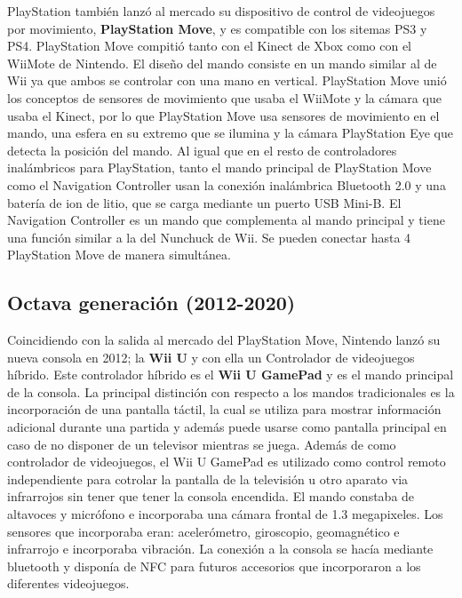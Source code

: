 PlayStation tambi\'en lanz\'o al mercado su dispositivo de control de videojuegos por movimiento, \textbf{PlayStation Move}, y es compatible con los sitemas PS3 y PS4. PlayStation Move compiti\'o tanto con el Kinect de Xbox como con el WiiMote de Nintendo. El dise\~no del mando consiste en un mando similar al de Wii ya que ambos se controlar con una mano en vertical. PlayStation Move uni\'o los conceptos de sensores de movimiento que usaba el WiiMote y la c\'amara que usaba el Kinect, por lo que PlayStation Move usa sensores de movimiento en el mando, una esfera en su extremo que se ilumina y la c\'amara PlayStation Eye que detecta la posici\'on del mando. Al igual que en el resto de controladores inal\'ambricos para PlayStation, tanto el mando principal de PlayStation Move como el Navigation Controller usan la conexi\'on inal\'ambrica Bluetooth 2.0 y una bater\'ia de ion de litio, que se carga mediante un puerto USB Mini-B. El Navigation Controller es un mando que complementa al mando principal y tiene una funci\'on similar a la del Nunchuck de Wii. Se pueden conectar hasta 4 PlayStation Move de manera simult\'anea.\\

\subsection{Octava generaci\'on (2012-2020)}

Coincidiendo con la salida al mercado del PlayStation Move, Nintendo lanz\'o su nueva consola en 2012; la \textbf{Wii U} y con ella un Controlador de videojuegos h\'ibrido. Este controlador h\'ibrido es el \textbf{Wii U GamePad} y es el mando principal de la consola. La principal distinci\'on con respecto a los mandos tradicionales es la incorporaci\'on de una pantalla t\'actil, la cual se utiliza para mostrar informaci\'on adicional durante una partida y adem\'as puede usarse como pantalla principal en caso de no disponer de un televisor mientras se juega. Adem\'as de como controlador de videojuegos, el Wii U GamePad es utilizado como control remoto independiente para cotrolar la pantalla de la televisi\'on u otro aparato via infrarrojos sin tener que tener la consola encendida. El mando constaba de altavoces y micr\'ofono e incorporaba una c\'amara frontal de 1.3 megapixeles. Los sensores que incorporaba eran: aceler\'ometro, giroscopio, geomagn\'etico e infrarrojo e incorporaba vibraci\'on. La conexi\'on a la consola se hac\'ia mediante bluetooth  y dispon\'ia de NFC para futuros accesorios que incorporaron a los diferentes videojuegos.\\


